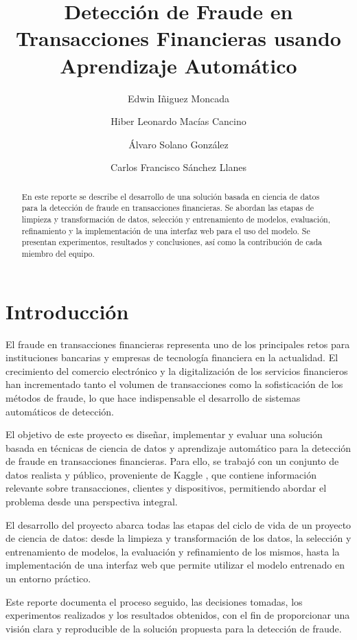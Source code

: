 \documentclass{llncs}
\title{Detección de Fraude en Transacciones Financieras usando Aprendizaje Automático}
\author{ }
\author{Edwin Iñiguez Moncada\inst{1}\orcidID{A01637064} \and
Hiber Leonardo Macías Cancino\inst{1}\orcidID{A01782765} \and
Álvaro Solano González\inst{1}\orcidID{A01643948} \and
Carlos Francisco Sánchez Llanes\inst{1}\orcidID{A01741201}}
\institute{Tecnológico de Monterrey}
\begin{document}
\maketitle

\begin{abstract}
En este reporte se describe el desarrollo de una solución basada en ciencia de datos para la detección de fraude en transacciones financieras. Se abordan las etapas de limpieza y transformación de datos, selección y entrenamiento de modelos, evaluación, refinamiento y la implementación de una interfaz web para el uso del modelo. Se presentan experimentos, resultados y conclusiones, así como la contribución de cada miembro del equipo.
\end{abstract}

\section{Introducción}

El fraude en transacciones financieras representa uno de los principales retos para instituciones bancarias y empresas de tecnología financiera en la actualidad. El crecimiento del comercio electrónico y la digitalización de los servicios financieros han incrementado tanto el volumen de transacciones como la sofisticación de los métodos de fraude, lo que hace indispensable el desarrollo de sistemas automáticos de detección.

El objetivo de este proyecto es diseñar, implementar y evaluar una solución basada en técnicas de ciencia de datos y aprendizaje automático para la detección de fraude en transacciones financieras. Para ello, se trabajó con un conjunto de datos realista y público, proveniente de Kaggle \cite{dataset}, que contiene información relevante sobre transacciones, clientes y dispositivos, permitiendo abordar el problema desde una perspectiva integral.

El desarrollo del proyecto abarca todas las etapas del ciclo de vida de un proyecto de ciencia de datos: desde la limpieza y transformación de los datos, la selección y entrenamiento de modelos, la evaluación y refinamiento de los mismos, hasta la implementación de una interfaz web que permite utilizar el modelo entrenado en un entorno práctico.

Este reporte documenta el proceso seguido, las decisiones tomadas, los experimentos realizados y los resultados obtenidos, con el fin de proporcionar una visión clara y reproducible de la solución propuesta para la detección de fraude.
\end{document}
